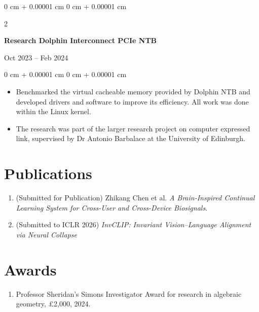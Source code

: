 \documentclass[10pt, a4paper]{article}
\newenvironment{highlights}{
    \begin{itemize}[
        topsep=0.10 cm,
        parsep=0.10 cm,
        partopsep=0pt,
        itemsep=0pt,
        leftmargin=0 cm + 10pt
    ]
}{
    \end{itemize}
} %
\newenvironment{onecolentry}{
    \begin{adjustwidth}{
        0 cm + 0.00001 cm
    }{
        0 cm + 0.00001 cm
    }
}{
    \end{adjustwidth}
} %
\newenvironment{twocolentry}[2][]{
    \onecolentry
    \def\secondColumn{#2}
    \setcolumnwidth{\fill, 4.5 cm}
    \begin{paracol}{2}
}{
    \switchcolumn \raggedleft \secondColumn
    \end{paracol}
    \endonecolentry
} %
\begin{document}
        \vspace{0.15 cm}

        \begin{twocolentry}{
            Oct 2023 – Feb 2024
        }
            \textbf{Research Dolphin Interconnect PCIe NTB}
		\end{twocolentry}
        \vspace{0.10 cm}
        \begin{onecolentry}
            \begin{highlights}
				\item Benchmarked the virtual cacheable memory provided by Dolphin NTB and developed drivers and software to improve its efficiency.
				All work was done within the Linux kernel.
                \item The research was part of the larger research project on computer expressed link, supervised by Dr Antonio Barbalace at the University of Edinburgh.
            \end{highlights}
        \end{onecolentry}
	
	\vspace{-0.3cm}
	\section{Publications}
	\begin{enumerate}
		\item (Submitted for Publication) Zhikang Chen et al. \textit{A Brain-Inspired Continual Learning System for Cross-User and Cross-Device Biosignals}.
		\item (Submitted to ICLR 2026) \textit{InvCLIP: Invariant Vision–Language Alignment via Neural Collapse}

	\end{enumerate}

	\vspace{-0.7cm}
	\section{Awards}
	\begin{enumerate}
		\item Professor Sheridan's Simons Investigator Award for research in algebraic geometry, £2,000, 2024.
	\end{enumerate}

	\vspace{-0.6cm}
\end{document}
